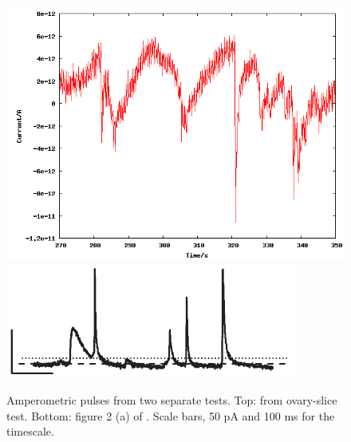 \begin{figure}
	\centering
	\includegraphics[width=0.7\linewidth]{figures/216.png}
	\includegraphics[width=0.7\linewidth]{figures/mosharok-pulse.png}
	\caption[Amperometric pulses]{Amperometric pulses from two separate tests. Top: from ovary-slice test. Bottom: figure 2 (a) of \cite{mosharok2005aee}. Scale bars, 50 pA and 100 ms for the timescale.}
	\label{amperometric-pulses}
\end{figure}
